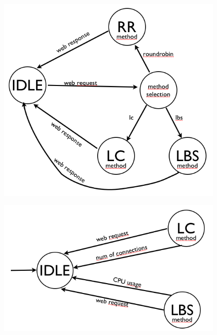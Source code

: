  \begin{figure}[ht]
        \centering
        \includegraphics[scale=0.45]{diagramas/auto1.png}
      \end{figure}
      
       \begin{figure}[ht]
        \centering
        \includegraphics[scale=0.45]{diagramas/auto2.png}
      \end{figure}